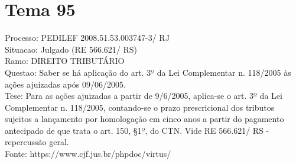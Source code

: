 \documentclass[12pt]{article}
\begin{document}
\section*{Tema 95}
Processo: PEDILEF 2008.51.53.003747-3/ RJ\\
Situacao: Julgado (RE 566.621/ RS)\\
Ramo: DIREITO TRIBUTÁRIO\\
Questao: Saber se há aplicação do art. 3º da Lei Complementar n. 118/2005 às ações ajuizadas após 09/06/2005.\\
Tese: Para as ações ajuizadas a partir de 9/6/2005, aplica-se o art. 3º da Lei Complementar n. 118/2005, contando-se o prazo prescricional dos tributos sujeitos a lançamento por homologação em cinco anos a partir do pagamento antecipado de que trata o art. 150, §1º, do CTN. Vide RE 566.621/ RS - repercussão geral.\\
Fonte: https://www.cjf.jus.br/phpdoc/virtus/
\end{document}
